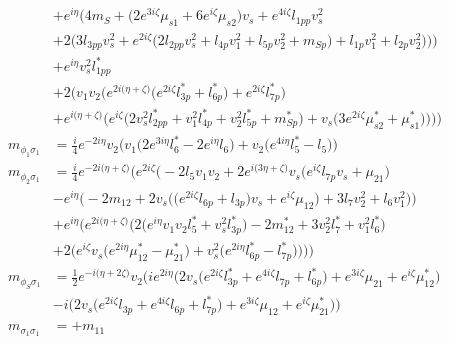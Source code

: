 \begin{itemize}
\begin{align}
 &+e^{i \eta } \Big(4 m_{S} +\Big(2 e^{3 i \zeta } \mu_{s1}  + 6 e^{i \zeta } \mu_{s2} \Big)v_s +e^{4 i \zeta } l_{1pp} v_{s}^{2} \nonumber \\ 
 &+2 \Big(3 l_{3pp} v_{s}^{2}  + e^{2 i \zeta } \Big(2 l_{2pp} v_{s}^{2}  + l_{4p} v_{1}^{2}  + l_{5p} v_{2}^{2}  + m_{Sp}\Big) + l_{1p} v_{1}^{2}  + l_{2p} v_{2}^{2} \Big)\Big)\Big)\nonumber \\ 
 &+e^{i \eta } v_{s}^{2} l_{1pp}^* \nonumber \\ 
 &+2 \Big(v_1 v_2 \Big(e^{2 i \Big(\eta +\zeta \Big)} \Big(e^{2 i \zeta } l_{3p}^*  + l_{6p}^*\Big) + e^{2 i \zeta } l_{7p}^* \Big)\nonumber \\ 
 &+e^{i \Big(\eta +\zeta \Big)} \Big(e^{i \zeta } \Big(2 v_{s}^{2} l_{2pp}^*  + v_{1}^{2} l_{4p}^*  + v_{2}^{2} l_{5p}^*  + m_{Sp}^*\Big) + v_s \Big(3 e^{2 i \zeta } \mu_{s2}^*  + \mu_{s1}^*\Big)\Big)\Big)\Big)\\ 
m_{\phi_1\sigma_1} &= \frac{i}{4} e^{-2 i \eta } v_2 \Big(v_1 \Big(2 e^{3 i \eta } l_6^*  -2 e^{i \eta } l_6 \Big) + v_2 \Big(e^{4 i \eta } l_5^*  - l_5 \Big)\Big)\\ 
m_{\phi_2\sigma_1} &= \frac{i}{4} e^{-2 i \Big(\eta +\zeta \Big)} \Big(e^{2 i \zeta } \Big(-2 l_5 v_1 v_2 +2 e^{i \Big(3 \eta +\zeta \Big)} v_s \Big(e^{i \zeta } l_{7p} v_s  + \mu_{21}\Big)\nonumber \\ 
 &- e^{i \eta } \Big(-2 m_{12}  + 2 v_s \Big(\Big(e^{2 i \zeta } l_{6p}  + l_{3p}\Big)v_s  + e^{i \zeta } \mu_{12} \Big) + 3 l_7 v_{2}^{2}  + l_6 v_{1}^{2} \Big)\Big)\nonumber \\ 
 &+e^{i \eta } \Big(e^{2 i \Big(\eta +\zeta \Big)} \Big(2 \Big(e^{i \eta } v_1 v_2 l_5^*  + v_{s}^{2} l_{3p}^* \Big) -2 m_{12}^*  + 3 v_{2}^{2} l_7^*  + v_{1}^{2} l_6^* \Big)\nonumber \\ 
 &+2 \Big(e^{i \zeta } v_s \Big(e^{2 i \eta } \mu_{12}^*  - \mu_{21}^* \Big) + v_{s}^{2} \Big(e^{2 i \eta } l_{6p}^*  - l_{7p}^* \Big)\Big)\Big)\Big)\\ 
m_{\phi_S\sigma_1} &= \frac{1}{2} e^{-i \Big(\eta +2 \zeta \Big)} v_2 \Big(i e^{2 i \eta } \Big(2 v_s \Big(e^{2 i \zeta } l_{3p}^*  + e^{4 i \zeta } l_{7p}  + l_{6p}^*\Big) + e^{3 i \zeta } \mu_{21}  + e^{i \zeta } \mu_{12}^* \Big)\nonumber \\ 
 &-i \Big(2 v_s \Big(e^{2 i \zeta } l_{3p}  + e^{4 i \zeta } l_{6p}  + l_{7p}^*\Big) + e^{3 i \zeta } \mu_{12}  + e^{i \zeta } \mu_{21}^* \Big)\Big)\\ 
m_{\sigma_1\sigma_1} &= +m_{11}\nonumber \\ 

\end{align}
\end{itemize}
